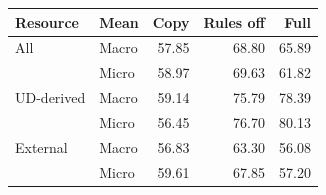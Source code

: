 \begin{tabular*}{\columnwidth}{@{\extracolsep{\fill}}llrrr@{}}\toprule
Resource & Mean & Copy & Rules off & Full \\\midrule
All & Macro & 57.85 & 68.80 & 65.89 \\
 & Micro & 58.97 & 69.63 & 61.82 \\
\addlinespace[2pt]
UD-derived & Macro & 59.14 & 75.79 & 78.39 \\
 & Micro & 56.45 & 76.70 & 80.13 \\
\addlinespace[2pt]
External & Macro & 56.83 & 63.30 & 56.08 \\
 & Micro & 59.61 & 67.85 & 57.20 \\
\bottomrule\end{tabular*}
